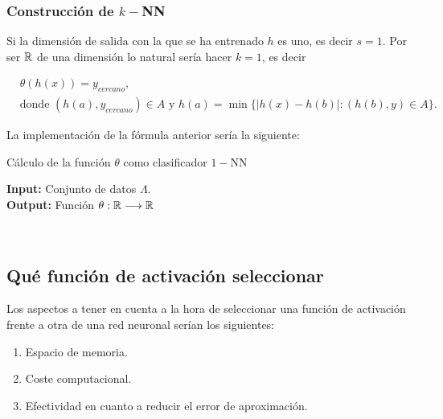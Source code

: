 \subsubsection*{Construcción de $k-$NN}  

Si la dimensión de salida con la que se ha entrenado $h$ es uno, es decir $s=1$. Por ser $\mathbb{R}$ de una dimensión lo natural sería hacer $k=1$, es decir 

\begin{align}
    & \theta(h(x)) = y_{cercano}, \\
    &\text{donde } 
    (h(a),  y_{cercano}) \in A 
    \text{ y }
    h(a) = \min \{|h(x) - h(b)| :  (h(b),  y) \in A  \}.
\end{align}

La implementación de la fórmula anterior sería la siguiente: 

\begin{algorithm}[H]
   \caption{ Cálculo de la función $\theta$ como clasificador $1-$NN} 
   \textbf{Input: } Conjunto de datos $\Lambda$.  \\
   \textbf{Output: } Función $\theta : \mathbb{R} \longrightarrow \mathbb{R}$
   \begin{algorithmic}[1]
    \STATE {} \\
    \Return{$\theta$}
   \end{algorithmic}
\end{algorithm}


\subsection{Qué función de activación seleccionar}

Los aspectos a tener en cuenta a la hora de seleccionar una función 
de activación frente a otra de una red neuronal serían los siguientes:
\begin{enumerate}
    \item Espacio de memoria.
    \item Coste computacional.
    \item Efectividad en cuanto a reducir el error de aproximación.
\end{enumerate}

